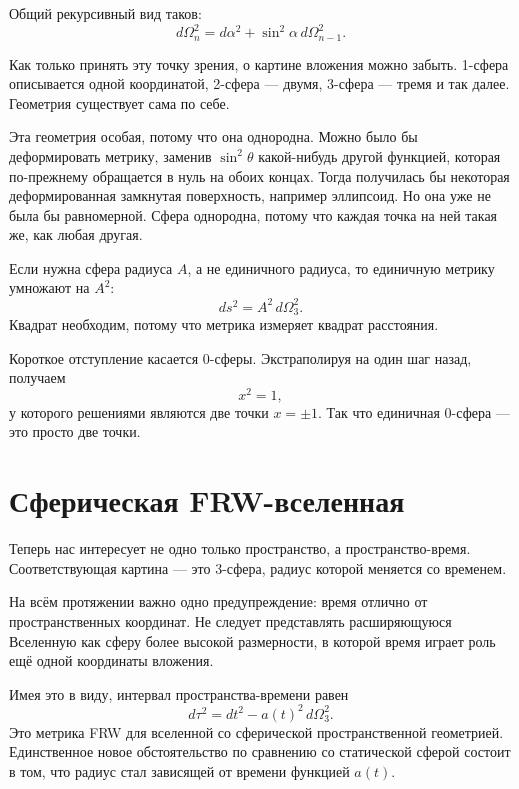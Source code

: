 Общий рекурсивный вид таков:
\begin{equation}
d\Omega_n^2=d\alpha^2+\sin^2\alpha\,d\Omega_{n-1}^2.
\end{equation}

Как только принять эту точку зрения, о картине вложения можно забыть. 1-сфера описывается одной координатой, 2-сфера — двумя, 3-сфера — тремя и так далее. Геометрия существует сама по себе.

Эта геометрия особая, потому что она однородна. Можно было бы деформировать метрику, заменив \(\sin^2\theta\) какой-нибудь другой функцией, которая по-прежнему обращается в нуль на обоих концах. Тогда получилась бы некоторая деформированная замкнутая поверхность, например эллипсоид. Но она уже не была бы равномерной. Сфера однородна, потому что каждая точка на ней такая же, как любая другая.

Если нужна сфера радиуса \(A\), а не единичного радиуса, то единичную метрику умножают на \(A^2\):
\begin{equation}
ds^2=A^2\,d\Omega_3^2.
\end{equation}
Квадрат необходим, потому что метрика измеряет квадрат расстояния.

Короткое отступление касается 0-сферы. Экстраполируя на один шаг назад, получаем
\begin{equation}
x^2=1,
\end{equation}
у которого решениями являются две точки \(x=\pm 1\). Так что единичная 0-сфера — это просто две точки.

\section{Сферическая FRW-вселенная}

Теперь нас интересует не одно только пространство, а пространство-время. Соответствующая картина — это 3-сфера, радиус которой меняется со временем.

На всём протяжении важно одно предупреждение: время отлично от пространственных координат. Не следует представлять расширяющуюся Вселенную как сферу более высокой размерности, в которой время играет роль ещё одной координаты вложения.

Имея это в виду, интервал пространства-времени равен
\begin{equation}
d\tau^2=dt^2-a(t)^2\,d\Omega_3^2.
\end{equation}
Это метрика FRW для вселенной со сферической пространственной геометрией. Единственное новое обстоятельство по сравнению со статической сферой состоит в том, что радиус стал зависящей от времени функцией \(a(t)\).

